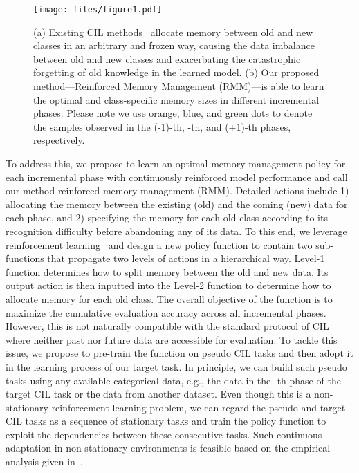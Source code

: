 \documentclass{article}
\newcommand{\cotronlvsapce}{\vspace{0.0cm}}
\newcommand{\cotronlcaptionvsapce}{\vspace{0.0cm}}
\begin{document}
\begin{figure}[t]
\centering
\texttt{[image: files/figure1.pdf]}
\cotronlcaptionvsapce
\caption{(a) Existing CIL methods~\cite{hou2019lucir,Liu2020AANets,rebuffi2017icarl} allocate memory between old and new classes in an arbitrary and frozen way, causing the data imbalance between old and new classes and exacerbating the catastrophic forgetting of old knowledge in the learned model. (b) Our proposed method---Reinforced Memory Management (RMM)---is able to learn the optimal and class-specific memory sizes in different incremental phases. Please note we use \textcolor[rgb]{0.87, 0.49, 0.35}{orange}, \textcolor[rgb]{0.27, 0.47, 0.69}{blue}, and \textcolor[rgb]{0.35, 0.58, 0.53}{green} dots to denote the samples observed in the (-1)-th, -th, and (+1)-th phases, respectively.
}
\vspace{-0.2cm}
\label{fig_1}
\cotronlvsapce
\end{figure} 
To address this, we propose to learn an optimal memory management policy for each incremental phase with continuously reinforced model performance and call our method reinforced memory management (RMM). Detailed actions include 1) allocating the memory between the existing (old) and the coming (new) data for each phase, and 2) specifying the memory for each old class according to its recognition difficulty before abandoning any of its data. To this end, we leverage reinforcement learning~\cite{li2019online,li2019online3,li2019online2,williams1992simple,ZophL17} and design a new policy function to contain two sub-functions that propagate two levels of actions in a hierarchical way. Level-1 function determines how to split memory between the old and new data. Its output action is then inputted into the Level-2 function to determine how to allocate memory for each old class. The overall objective of the function is to maximize the cumulative evaluation accuracy across all incremental phases. However, this is not naturally compatible with the standard protocol of CIL~\cite{rebuffi2017icarl} where neither past nor future data are accessible for evaluation. 
To tackle this issue, we propose to pre-train the function on pseudo CIL tasks and then adopt it in the learning process of our target task. 
In principle, we can build such pseudo tasks using any available categorical data, e.g., the data in the -th phase of the target CIL task or the data from another dataset. Even though this is a non-stationary reinforcement learning problem, we can regard the pseudo and target CIL tasks as a sequence of stationary tasks and train the policy function to exploit the dependencies between these consecutive tasks. Such continuous adaptation in non-stationary environments is feasible based on the empirical analysis given in~\cite{ShedivatBBSM18}.
\end{document}
